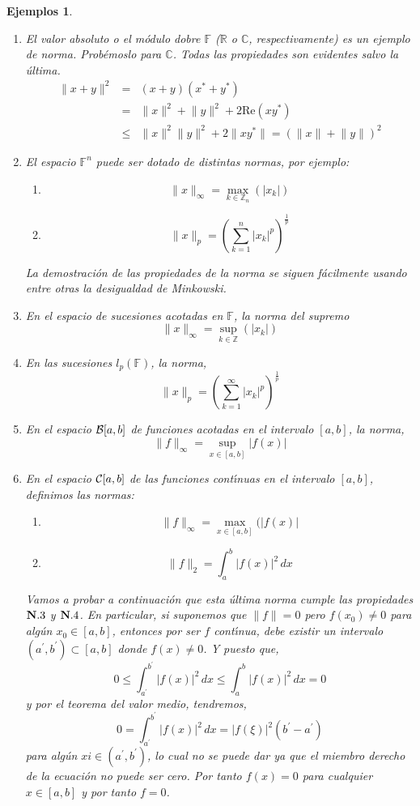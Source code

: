 \documentclass[12pt]{book}
\newtheorem{listaejemplos}{\bf Ejemplos}[chapter]
\begin{document}
\begin{listaejemplos}
\begin{enumerate}
\item El valor absoluto o el m\'odulo dobre $\mathbb{F}$ ($\mathbb{R}$ o $\mathbb{C}$, 
respectivamente) es un ejemplo de norma. Prob\'emoslo para $\mathbb{C}$. Todas las 
propiedades son evidentes salvo la \'ultima. 
\begin{eqnarray*}
\lVert x+y\rVert^2&=&(x+y)(x^*+y^*)\\
&=&\lVert x\rVert^2+\lVert y\rVert^2 +2\textrm{Re}(xy^*)\\
&\leq&\lVert x\rVert^2\lVert y\rVert^2 + 2\lVert xy^*\rVert=(\lVert x\rVert +\lVert y\rVert)^2
\end{eqnarray*}
\item El espacio $\mathbb{F}^n$ puede ser dotado de  distintas normas, por ejemplo:
\begin{enumerate}
 \item $$\lVert x\rVert_\infty=\mathop{\max}_{k\in\mathbb{Z}_n}(\lvert x_k\rvert)$$
 \item $$\lVert x\rVert_p=\left(\sum_{k=1}^n\lvert x_k\rvert^p\right)^{\frac{1}{p}}$$
\end{enumerate}La demostraci\'on de las propiedades de la norma se siguen f\'acilmente usando 
entre otras la desigualdad de Minkowski.
\item En el espacio de sucesiones acotadas en $\mathbb{F}$, la norma del supremo 
$$\lVert x\rVert_\infty=\mathop{\sup}_{k\in\mathbb{Z}}(\lvert x_k\rvert)$$
\item En las sucesiones $l_p(\mathbb{F})$,  la norma,
$$\lVert x\rVert_p=\left(\sum_{k=1}^\infty \lvert x_k\rvert^p\right)^\frac{1}{p}$$
\item En el espacio ${\cal B}[a,b]$ de funciones acotadas en el intervalo $[a,b]$, la norma,
$$\lVert f\rVert_\infty =\mathop{\sup}_{x\in[a,b]}\lvert f(x)\rvert$$
\item En el espacio ${\cal C}[a,b]$ de las funciones cont\'{\i}nuas en el intervalo $[a,b]$, definimos 
las normas:
\begin{enumerate}
\item $$\lVert f\rVert_\infty = \mathop{\max}_{x\in[a,b]}(\lvert f(x)\rvert$$
\item  $$\lVert f\rVert_2=\int_a^b \lvert f(x)\rvert^2\,dx$$
\end{enumerate}
Vamos a probar a continuaci\'on que esta \'ultima norma cumple las propiedades $\textrm{\bf N}.3$ 
y $\textrm{\bf N}.4$. En particular, si suponemos que $\lVert f\rVert=0$ pero $f(x_0)\not= 0$ para 
alg\'un $x_0\in[a,b]$, entonces por ser $f$ cont\'{\i}nua, debe existir un intervalo $
(a^\prime,b^\prime)\subset [a,b]$ donde $f(x)\not=0$. Y puesto que,
$$0\leq \int_{a^\prime}^{b^\prime}\lvert f(x)\rvert^2\,dx\leq \int_a^b\lvert f(x)\rvert^2\,dx=0$$
y por el teorema del valor medio, tendremos,
$$0=\int_{a^\prime}^{b^\prime}\lvert f(x)\rvert^2\,dx=\lvert f(\xi)\rvert^2(b^\prime-a^\prime)$$
para alg\'un $xi\in(a^\prime,b^\prime)$, lo cual no se puede dar ya que el miembro derecho de la 
ecuaci\'on no puede ser cero. Por tanto $f(x)=0$ para cualquier $x\in[a,b]$ y por tanto $f=0$. 


\end{enumerate}
\end{listaejemplos}
\end{document}

